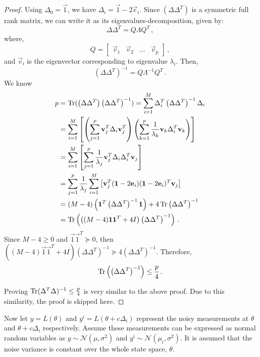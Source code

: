 \begin{proof}
Using $\Delta_0 = \vec{1}$, we have $\Delta_i = \vec{1}-2\vec{e}_i$. Since $(\Delta \Delta^T)$ is a symmetric full rank matrix, we can write it as its eigenvalues-decomposition, given by:
$$ \Delta \Delta^T = Q \Lambda Q^T\,,$$
where,
$$ Q = \begin{bmatrix}  \vec{v}_1 &  \vec{v}_2 & \hdots & \vec{v}_p \end{bmatrix}\,,$$
and $\vec{v}_i$ is the eigenvector corresponding to eigenvalue $\lambda_i$. Then,
$$ \left(\Delta \Delta^T \right)^{-1}= Q \Lambda^{-1} Q^T\,.$$
We know
\begin{equation}
\begin{aligned}
p &= \operatorname{Tr}(\left(\Delta \Delta^T \right) \left(\Delta \Delta^T \right)^{-1}) = \sum_{i=1}^M \Delta_i^T \left(\Delta \Delta^T \right)^{-1} \Delta_i \\
&= \sum_{i=1}^M \left[ \left(\sum_{j=1}^p \mathbf{v}_j^T \Delta_i \mathbf{v}_j^T\right) \left(\sum_{k=1}^p \frac{1}{\lambda_k}\mathbf{v}_k \Delta_i^T \mathbf{v}_k \right) \right] \\
&=\sum_{i=1}^M \left[ \sum_{j=1}^p \frac{1}{\lambda_j} \mathbf{v}_j^T \Delta_i \Delta_i^T \mathbf{v}_j \right] \\
&=\sum_{j=1}^p \frac{1}{\lambda_j} \sum_{i=1}^M \left[ \mathbf{v}_j^T (\mathbf{1}-2\mathbf{e}_i) (\mathbf{1}-2\mathbf{e}_i)^T \mathbf{v}_j \right] \\
&= (M-4) \left(\mathbf{1}^T \left(\Delta \Delta^T \right)^{-1} \mathbf{1} \right) + 4\operatorname{Tr} \left(\Delta \Delta^T \right)^{-1} \\
&= \operatorname{Tr} \left( \left((M-4) \mathbf{1}\mathbf{1}^T+4I\right) \left(\Delta \Delta^T \right)^{-1} \right)\,.
\end{aligned}
\end{equation}
Since $M-4\geq 0$ and $\vec{1}\vec{1}^T \succeq 0$, then $\left((M-4) \vec{1}\vec{1}^T+4I\right) \left(\Delta \Delta^T \right)^{-1} \succeq 4 \left(\Delta \Delta^T \right)^{-1}$. Therefore,
$$\operatorname{Tr} \left( \left(\Delta \Delta^T \right)^{-1} \right) \leq \frac{p}{4} \,.$$

Proving $\operatorname{Tr} (\Delta^T \Delta)^{-1} \leq \frac{p}{4}$ is very similar to the above proof. Due to this similarity, the proof is skipped here.
\end{proof}

Now let $y=L(\theta)$ and $y^i=L(\theta+c\Delta_i)$ represent the noisy measurements at $\theta$ and $\theta+c\Delta_i$ respectively. Assume these measurements can be expressed as normal random variables as $y \sim \mathcal{N}(\mu,\sigma^2)$ and $y^i \sim \mathcal{N}(\mu_i,\sigma^2)$. It is assumed that the noise variance is constant over the whole state space, $\theta$. 

